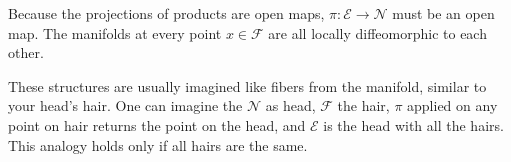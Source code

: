 Because the projections of products are open maps, $\pi: \mathcal{E}\rightarrow \mathcal{N}$ must be an open map. The manifolds at every point $x\in \mathcal{F}$ are all locally diffeomorphic to each other.

These structures are usually imagined like fibers from the manifold, similar to your head's hair. One can imagine the $\mathcal N$ as head, $\mathcal F$ the hair, $\pi$ applied on any point on hair returns the point on the head, and $\mathcal E$ is the head with all the hairs. This analogy holds only if all hairs are the same.








